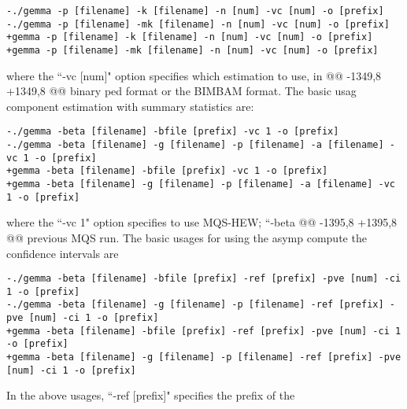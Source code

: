  \begin{verbatim}
-./gemma -p [filename] -k [filename] -n [num] -vc [num] -o [prefix]
-./gemma -p [filename] -mk [filename] -n [num] -vc [num] -o [prefix]
+gemma -p [filename] -k [filename] -n [num] -vc [num] -o [prefix]
+gemma -p [filename] -mk [filename] -n [num] -vc [num] -o [prefix]
 \end{verbatim}
 
 where the ``-vc [num]" option specifies which estimation to use, in
@@ -1349,8 +1349,8 @@ binary ped format or the BIMBAM format. The basic usag
 component estimation with summary statistics are:
 
 \begin{verbatim}
-./gemma -beta [filename] -bfile [prefix] -vc 1 -o [prefix]
-./gemma -beta [filename] -g [filename] -p [filename] -a [filename] -vc 1 -o [prefix]
+gemma -beta [filename] -bfile [prefix] -vc 1 -o [prefix]
+gemma -beta [filename] -g [filename] -p [filename] -a [filename] -vc 1 -o [prefix]
 \end{verbatim}
 
 where the ``-vc 1" option specifies to use MQS-HEW; ``-beta
@@ -1395,8 +1395,8 @@ previous MQS run. The basic usages for using the asymp
 compute the confidence intervals are
 
 \begin{verbatim}
-./gemma -beta [filename] -bfile [prefix] -ref [prefix] -pve [num] -ci 1 -o [prefix]
-./gemma -beta [filename] -g [filename] -p [filename] -ref [prefix] -pve [num] -ci 1 -o [prefix]
+gemma -beta [filename] -bfile [prefix] -ref [prefix] -pve [num] -ci 1 -o [prefix]
+gemma -beta [filename] -g [filename] -p [filename] -ref [prefix] -pve [num] -ci 1 -o [prefix]
 \end{verbatim}
 
 In the above usages, ``-ref [prefix]" specifies the prefix of the
